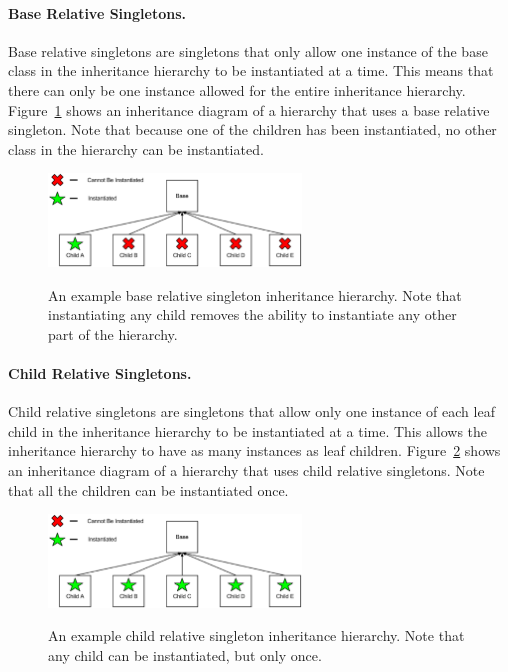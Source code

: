 \documentclass[12pt]{ucthesis}
\newcommand{\captionfonts}{\small\bf\ssp}
\begin{document}
\paragraph{Base Relative Singletons.}
Base relative singletons are singletons that only allow one instance of the base class in the inheritance hierarchy to be instantiated
at a time. This means that there can only be one instance allowed for the entire inheritance hierarchy.
Figure~\ref{fig:baseSingleton} shows an inheritance diagram of a hierarchy that uses a base relative singleton.
Note that because one of the children has been instantiated, no other class in the hierarchy can be instantiated.

\begin{figure}[H]
   \begin{center}
      \includegraphics[width=0.6\textwidth]{images/Base_Singleton.eps}
      \captionfonts
      \caption[Base Relative Singleton]{An example base relative singleton inheritance hierarchy. Note that instantiating any child removes the ability to instantiate any other part of the hierarchy.}
      \label{fig:baseSingleton}
   \end{center}
\end{figure}

\paragraph{Child Relative Singletons.}
Child relative singletons are singletons that allow only one instance of each leaf child in the inheritance hierarchy to be instantiated
at a time. This allows the inheritance hierarchy to have as many instances as leaf children.
Figure~\ref{fig:childSingleton} shows an inheritance diagram of a hierarchy that uses child relative singletons.
Note that all the children can be instantiated once.

\begin{figure}[H]
   \begin{center}
      \includegraphics[width=0.6\textwidth]{images/Child_Singleton.eps}
      \captionfonts
      \caption[Child Relative Singleton]{An example child relative singleton inheritance hierarchy. Note that any child can be instantiated, but only once.}
      \label{fig:childSingleton}
   \end{center}
\end{figure}
\end{document}
